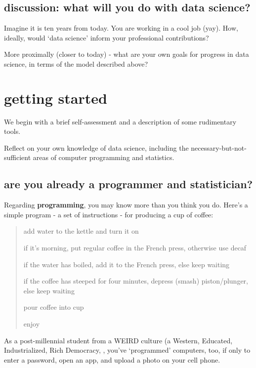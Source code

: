 \documentclass[openany]{book}
\begin{document}
\hypertarget{discussion-what-will-you-do-with-data-science}{%
\section{discussion: what will you do with data science?}\label{discussion-what-will-you-do-with-data-science}}

Imagine it is ten years from today. You are working in a cool job (yay). How, ideally, would `data science' inform your professional contributions?

More proximally (closer to today) - what are your own goals for progress in data science, in terms of the model described above?

\hypertarget{getting-started}{%
\chapter{getting started}\label{getting-started}}

We begin with a brief self-assessment and a description of some rudimentary tools.

Reflect on your own knowledge of data science, including the necessary-but-not-sufficient areas of computer programming and statistics.

\hypertarget{are-you-already-a-programmer-and-statistician}{%
\section{are you already a programmer and statistician?}\label{are-you-already-a-programmer-and-statistician}}

Regarding \textbf{programming}, you may know more than you think you do. Here's a simple program - a set of instructions - for producing a cup of coffee:

\begin{quote}
add water to the kettle and turn it on

if it's morning, put regular coffee in the French press, otherwise use decaf

if the water has boiled, add it to the French press, else keep waiting

if the coffee has steeped for four minutes, depress (smash) piston/plunger, else keep waiting

pour coffee into cup

enjoy
\end{quote}

As a post-millennial student from a WEIRD culture (a Western, Educated, Industrialized, Rich Democracy, \citet{henrich2010weirdest}, you've `programmed' computers, too, if only to enter a password, open an app, and upload a photo on your cell phone.
\end{document}
